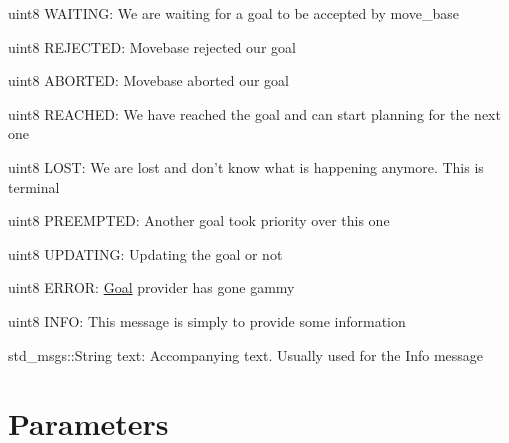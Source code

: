 \begin{DoxyItemize}
\item uint8 \-W\-A\-I\-T\-I\-N\-G\-: \-We are waiting for a goal to be accepted by move\-\_\-base
\end{DoxyItemize}


\begin{DoxyItemize}
\item uint8 \-R\-E\-J\-E\-C\-T\-E\-D\-: \-Movebase rejected our goal
\end{DoxyItemize}


\begin{DoxyItemize}
\item uint8 \-A\-B\-O\-R\-T\-E\-D\-: \-Movebase aborted our goal
\end{DoxyItemize}


\begin{DoxyItemize}
\item uint8 \-R\-E\-A\-C\-H\-E\-D\-: \-We have reached the goal and can start planning for the next one
\end{DoxyItemize}


\begin{DoxyItemize}
\item uint8 \-L\-O\-S\-T\-: \-We are lost and don't know what is happening anymore. \-This is terminal
\end{DoxyItemize}


\begin{DoxyItemize}
\item uint8 \-P\-R\-E\-E\-M\-P\-T\-E\-D\-: \-Another goal took priority over this one
\end{DoxyItemize}


\begin{DoxyItemize}
\item uint8 \-U\-P\-D\-A\-T\-I\-N\-G\-: \-Updating the goal or not
\end{DoxyItemize}


\begin{DoxyItemize}
\item uint8 \-E\-R\-R\-O\-R\-: \hyperlink{classGoal}{\-Goal} provider has gone gammy
\end{DoxyItemize}


\begin{DoxyItemize}
\item uint8 \-I\-N\-F\-O\-: \-This message is simply to provide some information
\end{DoxyItemize}

std\-\_\-msgs\-::\-String text\-: \-Accompanying text. \-Usually used for the \-Info message \hypertarget{index_parameters}{}\section{\-Parameters}\label{index_parameters}


